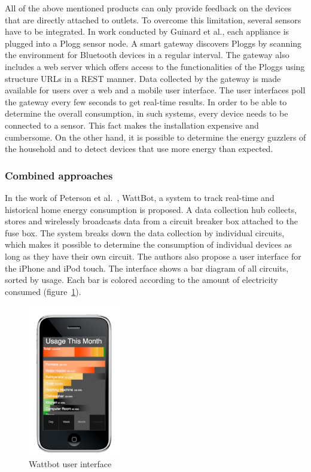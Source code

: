 All of the above mentioned products can only provide feedback on the devices that are directly attached to outlets. To overcome this limitation, several sensors have to be integrated. 
In work conducted by Guinard et al.\cite{weiss:inprocMUM:2010}, each appliance is plugged into a Plogg sensor node. A smart gateway discovers Ploggs by scanning the environment for Bluetooth devices in a regular interval. The gateway also includes a web server which offers access to the functionalities of the Ploggs using structure URLs in a REST manner. Data collected by the gateway is made available for users over a web and a mobile user interface. The user interfaces poll the gateway every few seconds to get real-time results.   	
In order to be able to determine the overall consumption, in such systems, every device needs to be connected to a sensor. This fact makes the installation expensive and cumbersome. 
On the other hand, it is possible to determine the energy guzzlers of the household and to detect devices that use more energy than expected.
\subsubsection{Combined approaches}
In the work of Peterson et al.~\cite{Petersen_2009}, WattBot, a system to track real-time and historical home energy consumption is proposed.  
A data collection hub collects, stores and wirelessly broadcasts data from a circuit breaker box attached to the fuse box. The system breaks down the data collection by individual circuits, which makes it possible to determine the consumption of individual devices as long as they have their own circuit. The authors also propose a user interface for the iPhone and iPod touch. The interface shows a bar diagram of all circuits, sorted by usage. Each bar is colored according to the amount of electricity consumed (figure~\ref{wattbot}).

\begin{figure}[htbp]
\begin{center}
\includegraphics[width=4cm]{Images/wattbot.jpg}
\caption{Wattbot user interface}
\label{wattbot}
\end{center}
\end{figure} 
 

